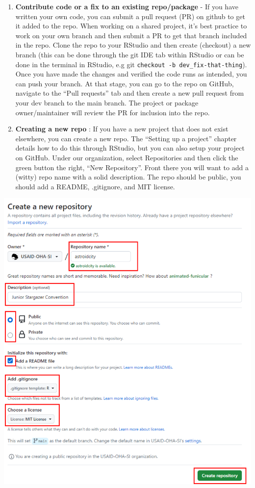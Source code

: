 \documentclass[
  letterpaper,
  DIV=11,
  numbers=noendperiod]{scrreprt}
\begin{document}
\begin{enumerate}
\def\labelenumi{\alph{enumi}.}
\setcounter{enumi}{1}
\item
  \textbf{Contribute code or a fix to an existing repo/package} - If you
  have written your own code, you can submit a pull request (PR) on
  github to get it added to the repo. When working on a shared project,
  it's best practice to work on your own branch and then submit a PR to
  get that branch included in the repo. Clone the repo to your RStudio
  and then create (checkout) a new branch (this can be done through the
  git IDE tab within RStudio or can be done in the terminal in RStudio,
  e.g git \texttt{checkout\ -b\ dev\_fix-that-thing}). Once you have
  made the changes and verified the code runs as intended, you can push
  your branch. At that stage, you can go to the repo on GitHub, navigate
  to the ``Pull requests'' tab and then create a new pull request from
  your dev branch to the main branch. The project or package
  owner/maintainer will review the PR for inclusion into the repo.
\item
  \textbf{Creating a new repo} : If you have a new project that does not
  exist elsewhere, you can create a new repo. The ``Setting up a
  project'' chapter details how to do this through RStudio, but you can
  also setup your project on GitHub. Under our organization, select
  Repositories and then click the green button the right, ``New
  Repository''. Front there you will want to add a (witty) repo name
  with a solid description. The repo should be public, you should add a
  README, .gitignore, and MIT license.
\end{enumerate}

\includegraphics{./images/image33 - new repo.png}
\end{document}
